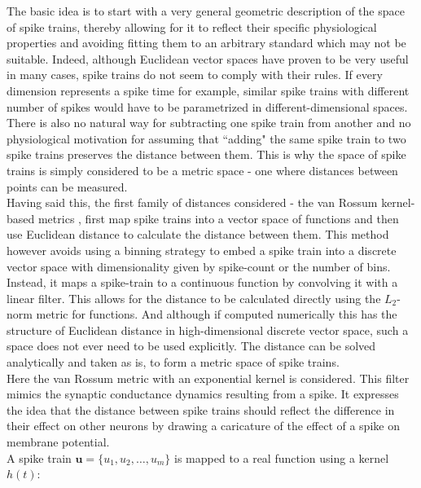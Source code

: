 \documentclass[12pt]{extarticle}
\begin{document}
\noindent
The basic idea is to start with a very general geometric description
of the space of spike trains, thereby allowing for it to reflect their
specific physiological properties and avoiding fitting them to an
arbitrary standard which may not be suitable. Indeed, although
Euclidean vector spaces have proven to be very useful in many cases,
spike trains do not seem to comply with their rules. If every dimension
represents a spike time for example, similar spike
trains with different number of spikes would have to be parametrized
in different-dimensional spaces. There is also no natural way for
subtracting one spike train from another and no physiological
motivation for assuming that ``adding" the same spike train to two
spike trains preserves the distance between them. This is why the
space of spike trains is simply considered to be a metric space - one
where distances between points can be measured.\\

\noindent
Having said this, the first family of distances considered -
the van Rossum kernel-based metrics \cite{van.Rossum}, first map spike trains
into a vector space of functions and then use Euclidean distance to calculate
the distance between them. This method however avoids using a binning
strategy to embed a spike train into a discrete vector space with
dimensionality given by spike-count or the number of bins. Instead, it
maps a spike-train to a continuous function by convolving it with a
linear filter. This allows for the distance to be calculated directly
using the $L_2$-norm metric for functions. And although if computed numerically this 
has the structure of Euclidean distance in high-dimensional discrete vector 
space, such a space does not ever need to be used explicitly. The distance can be
solved analytically and taken as is, to form a metric space of spike trains.\\

\noindent
Here the van Rossum metric with an exponential kernel is
considered. This filter mimics the synaptic conductance dynamics
resulting from a spike. It expresses the idea that the distance
between spike trains should reflect the difference in their effect on
other neurons by drawing a caricature of the effect of a spike on
membrane potential.\\

\noindent
A spike train $\mathbf{u} = \{u_1, u_2, \ldots, u_m\}$ is mapped to a real function using a kernel $h(t)$:
\end{document}
